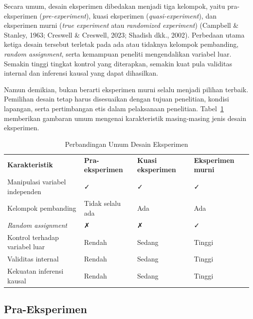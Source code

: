 \documentclass[
  indonesian,
  letterpaper,
  DIV=11,
  numbers=noendperiod]{scrreprt}
\begin{document}
Secara umum, desain eksperimen dibedakan menjadi tiga kelompok, yaitu
pra-eksperimen (\emph{pre-experiment}), kuasi eksperimen
(\emph{quasi-experiment}), dan eksperimen murni (\emph{true experiment}
atau \emph{randomized experiment}) (Campbell \& Stanley, 1963; Creswell
\& Creswell, 2023; Shadish dkk., 2002). Perbedaan utama ketiga desain
tersebut terletak pada ada atau tidaknya kelompok pembanding,
\emph{random assignment}, serta kemampuan peneliti mengendalikan
variabel luar. Semakin tinggi tingkat kontrol yang diterapkan, semakin
kuat pula validitas internal dan inferensi kausal yang dapat dihasilkan.

Namun demikian, bukan berarti eksperimen murni selalu menjadi pilihan
terbaik. Pemilihan desain tetap harus disesuaikan dengan tujuan
penelitian, kondisi lapangan, serta pertimbangan etis dalam pelaksanaan
penelitian. Tabel~\ref{tbl-desaineksp} memberikan gambaran umum mengenai
karakteristik masing-masing jenis desain eksperimen.

\begin{longtable}[]{@{}
  >{\raggedright\arraybackslash}p{}
  >{\centering\arraybackslash}p{}
  >{\centering\arraybackslash}p{}
  >{\centering\arraybackslash}p{}@{}}
\caption{Perbandingan Umum Desain
Eksperimen}\label{tbl-desaineksp}\tabularnewline
\toprule\noalign{}
\endfirsthead
\endhead
\bottomrule\noalign{}
\endlastfoot
\textbf{Karakteristik} & \textbf{Pra-eksperimen} & \textbf{Kuasi
eksperimen} & \textbf{Eksperimen murni} \\
Manipulasi variabel independen & ✓ & ✓ & ✓ \\
Kelompok pembanding & Tidak selalu ada & Ada & Ada \\
\emph{Random assignment} & ✗ & ✗ & ✓ \\
Kontrol terhadap variabel luar & Rendah & Sedang & Tinggi \\
Validitas internal & Rendah & Sedang & Tinggi \\
Kekuatan inferensi kausal & Rendah & Sedang & Tinggi \\
\end{longtable}

\subsection{Pra-Eksperimen}\label{pra-eksperimen}
\end{document}
